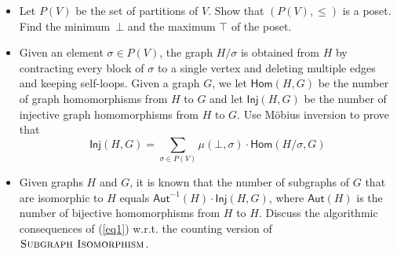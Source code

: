 \documentclass{uebung_cs}
\begin{document}
\begin{exercise}
\begin{enumerate}
  \begin{itemize}
  \item Let $P(V)$ be the set of partitions of $V$. Show that $(P(V),\leq)$ is a poset. Find the minimum~$\bot$ and the maximum $\top$ of the poset.
  \item Given an element $\sigma \in P(V)$, the graph $H/\sigma$ is obtained from $H$ by contracting every block of $\sigma$ to a single vertex and deleting multiple edges and keeping self-loops. Given a graph $G$, we let $\mathsf{Hom}(H,G)$ be the number of graph homomorphisms from $H$ to $G$ and let $\mathsf{Inj}(H,G)$ be the number of injective graph homomorphisms from $H$ to $G$. Use Möbius inversion to prove that 
  \begin{equation}\label{eq1}
  \mathsf{Inj}(H,G) = \sum_{\sigma \in P(V)} \mu(\bot,\sigma)\cdot \mathsf{Hom}(H/\sigma,G) 
  \end{equation}
  \item Given graphs $H$ and $G$, it is known that the number of subgraphs of $G$ that are isomorphic to $H$ equals $\mathsf{Aut}^{-1}(H)\cdot \mathsf{Inj}(H,G)$, where $\mathsf{Aut}(H)$ is the number of bijective homomorphisms from $H$ to $H$. Discuss the algorithmic consequences of (\ref{eq1}) w.r.t. the counting version of $\textsc{Subgraph Isomorphism}$.
  \end{itemize}
  \end{enumerate}
  \end{exercise}
\end{document}

